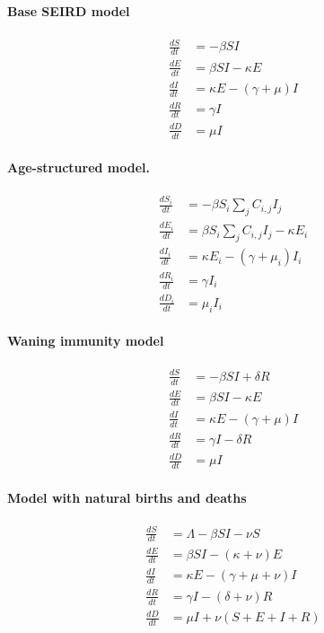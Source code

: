 \documentclass[]{article}
\begin{document}
\paragraph{Base SEIRD model}
\begin{align}
\frac{dS}{dt} &= - \beta S I\\
\frac{dE}{dt} &= \beta S I - \kappa E\\
\frac{dI}{dt} &= \kappa E - (\gamma + \mu) I\\
\frac{dR}{dt} &= \gamma I\\
\frac{dD}{dt} &= \mu I
\end{align}

\paragraph{Age-structured model.}

\begin{align}
\frac{dS_i}{dt} &= - \beta S_i \sum_{j} C_{i,j} I_j\\
\frac{dE_i}{dt} &= \beta S_i \sum_{j} C_{i,j} I_j - \kappa E_i\\
\frac{dI_i}{dt} &= \kappa E_i - (\gamma + \mu_i) I_i\\
\frac{dR_i}{dt} &= \gamma I_i\\
\frac{dD_i}{dt} &= \mu_i I_i
\end{align}

\paragraph{Waning immunity model}
\begin{align}
\frac{dS}{dt} &= - \beta S I + \delta R\\
\frac{dE}{dt} &= \beta S I - \kappa E\\
\frac{dI}{dt} &= \kappa E - (\gamma + \mu) I\\
\frac{dR}{dt} &= \gamma I - \delta R\\
\frac{dD}{dt} &= \mu I
\end{align}

\paragraph{Model with natural births and deaths}
\begin{align}
\frac{dS}{dt} &= \Lambda - \beta S I - \nu S\\
\frac{dE}{dt} &= \beta S I - (\kappa + \nu) E\\
\frac{dI}{dt} &= \kappa E - (\gamma + \mu + \nu) I\\
\frac{dR}{dt} &= \gamma I - (\delta + \nu) R\\
\frac{dD}{dt} &= \mu I + \nu (S + E + I + R)
\end{align}
\end{document}
